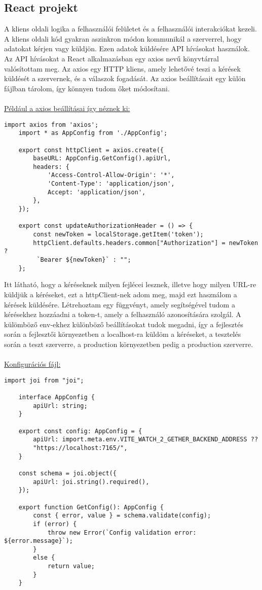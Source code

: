 \subsection*{React projekt}
A kliens oldali logika a felhasználói felületet és a felhasználói interakciókat kezeli. A kliens oldali kód gyakran aszinkron módon kommunikál a szerverrel, hogy adatokat kérjen vagy küldjön.
Ezen adatok küldésére API hívásokat használok. Az API hívásokat a React alkalmazásban egy axios nevű könyvtárral valósítottam meg.
Az axios \cite[]{axios} egy HTTP kliens, amely lehetővé teszi a kérések küldését a szervernek, és a válaszok fogadását.
Az axios beállításait egy külön fájlban tárolom, így könnyen tudom őket módosítani.
\\
\\
\underline{Például a axios beállításai így néznek ki:}
\begin{lstlisting}[style=es6,caption={Axios beállítások}]
    import axios from 'axios';
    import * as AppConfig from './AppConfig';

    export const httpClient = axios.create({
        baseURL: AppConfig.GetConfig().apiUrl,
        headers: {
            'Access-Control-Allow-Origin': '*',
            'Content-Type': 'application/json',
            Accept: 'application/json',
        },
    });

    export const updateAuthorizationHeader = () => {
        const newToken = localStorage.getItem('token');
        httpClient.defaults.headers.common["Authorization"] = newToken ?
         `Bearer ${newToken}` : "";
    };
\end{lstlisting}
\vspace{1em}
Itt látható, hogy a kéréseknek milyen fejlécei lesznek, illetve hogy milyen URL-re küldjük a kéréseket, ezt a httpClient-nek adom meg, majd ezt használom a kérések küldésére.
Létrehoztam egy függvényt, amely segítségével tudom a kérésekhez hozzáadni a token-t, amely a felhasználó azonosítására szolgál.
A külömböző env-ekhez különböző beállításokat tudok megadni, így a fejlesztés során a fejlesztői környezetben a localhost-ra küldöm a kéréseket, a tesztelés során a teszt szerverre, a production környezetben pedig a production szerverre.
\\
\\
\underline{Konfigurációs fájl:}
\begin{lstlisting}[style=es6,caption={Konfigurációs fájl}]
    import joi from "joi";

    interface AppConfig {
        apiUrl: string;
    }
    
    export const config: AppConfig = {
        apiUrl: import.meta.env.VITE_WATCH_2_GETHER_BACKEND_ADDRESS ??
        "https://localhost:7165/",
    }
    
    const schema = joi.object({
        apiUrl: joi.string().required(),
    });
    
    export function GetConfig(): AppConfig {
        const { error, value } = schema.validate(config);
        if (error) {
            throw new Error(`Config validation error: ${error.message}`);
        }
        else {
            return value;
        }
    }
\end{lstlisting}
